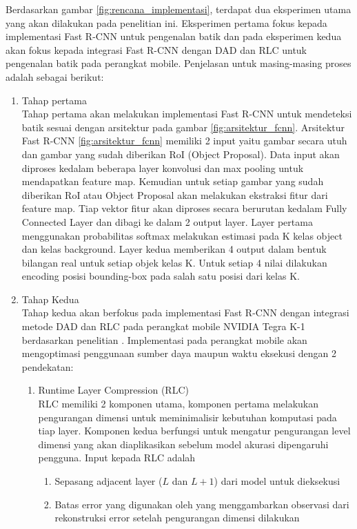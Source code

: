 Berdasarkan gambar \ref{fig:rencana_implementasi}, terdapat dua eksperimen utama yang akan dilakukan pada penelitian ini. Eksperimen pertama fokus kepada implementasi Fast R-CNN untuk pengenalan batik dan pada eksperimen kedua akan fokus kepada integrasi Fast R-CNN dengan DAD dan RLC untuk pengenalan batik pada perangkat mobile. Penjelasan untuk masing-masing proses adalah sebagai berikut:
\begin{enumerate}
	\item Tahap pertama\\
	Tahap pertama akan melakukan implementasi Fast R-CNN untuk mendeteksi batik sesuai dengan arsitektur pada gambar \ref{fig:arsitektur_fcnn}. Arsitektur Fast R-CNN \ref{fig:arsitektur_fcnn} memiliki 2 input yaitu gambar secara utuh dan gambar yang sudah diberikan RoI (Object Proposal). Data input akan diproses kedalam beberapa layer konvolusi dan max pooling untuk mendapatkan feature map. Kemudian untuk setiap gambar yang sudah diberikan RoI atau Object Proposal akan melakukan ekstraksi fitur dari feature map. Tiap vektor fitur akan diproses secara berurutan kedalam Fully Connected Layer dan dibagi ke dalam 2 output layer. Layer pertama menggunakan probabilitas softmax melakukan estimasi pada K kelas object dan kelas background. Layer kedua memberikan 4 output dalam bentuk bilangan real untuk setiap objek kelas K. Untuk setiap 4 nilai dilakukan encoding posisi bounding-box pada salah satu posisi dari kelas K.
	\item Tahap Kedua\\
	Tahap kedua akan berfokus pada implementasi Fast R-CNN dengan integrasi metode DAD dan RLC pada perangkat mobile NVIDIA Tegra K-1 berdasarkan penelitian \cite{deepx}. Implementasi pada perangkat mobile akan mengoptimasi penggunaan sumber daya maupun waktu eksekusi dengan 2 pendekatan:
	\begin{enumerate}
		\item Runtime Layer Compression (RLC)\\
		RLC memiliki 2 komponen utama, komponen pertama melakukan pengurangan dimensi untuk meminimalisir kebutuhan komputasi pada tiap layer. Komponen kedua berfungsi untuk mengatur pengurangan level dimensi yang akan diaplikasikan sebelum model akurasi dipengaruhi pengguna. Input kepada RLC adalah
		\begin{enumerate}
			\item Sepasang adjacent layer ($L$ dan $L + 1$) dari model untuk dieksekusi
			\item Batas error yang digunakan oleh yang menggambarkan observasi dari rekonstruksi error setelah pengurangan dimensi dilakukan

\end{enumerate}
\end{enumerate}
\end{enumerate}
